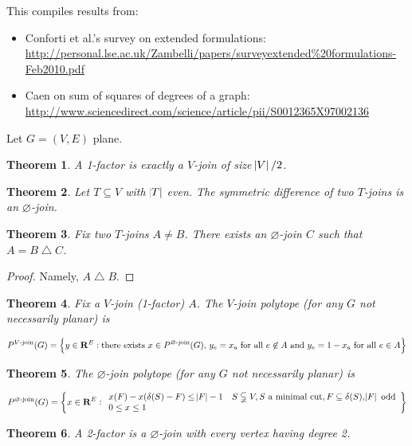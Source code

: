 \documentclass{article}
\newtheorem{theorem}{Theorem}
\begin{document}
This compiles results from:
\begin{itemize}
\item Conforti et al.'s survey on extended formulations: \url{http://personal.lse.ac.uk/Zambelli/papers/surveyextended\%20formulations-Feb2010.pdf}
\item Caen on sum of squares of degrees of a graph: \url{http://www.sciencedirect.com/science/article/pii/S0012365X97002136}
\end{itemize}

Let $G=(V,E)$ plane.

\begin{theorem}
	A 1-factor is exactly a $V$-join of size $\abs{V}/2$.
\end{theorem}
\begin{theorem}
Let $T\subseteq V$ with $\abs{T}$ even. The symmetric difference of two $T$-joins is an $\varnothing$-join.
\end{theorem}
\begin{theorem}
Fix two $T$-joins $A\neq B$. There exists an $\varnothing$-join $C$ such that $A = B\bigtriangleup C$.
\end{theorem}
\begin{proof}
Namely, $A\bigtriangleup B$.
\end{proof}

\begin{theorem}
Fix a $V$-join (1-factor) $A$. The $V$-join polytope (for any $G$ not necessarily planar) is

$$P^{\text{$V$-join}}(G) = \cbr{y\in \mathbf{R}^E: \text{there exists $x\in P^{\text{$\varnothing$-join}}(G)$, $y_e = x_e$ for all $e\not\in A$ and $y_e=1-x_e$ for all $e\in A$}}$$
\end{theorem}

\begin{theorem}
The $\varnothing$-join polytope (for any $G$ not necessarily planar) is

$$P^{\text{$\varnothing$-join}}(G) = \cbr{x\in\mathbf{R}^E: \begin{array}{ll}
x(F)-x(\delta(S)-F) \leq \abs{F}-1 & S\subsetneqq V, \text{$S$ a minimal cut}, F\subseteq \delta(S), \abs{F}\text{ odd} \\
0\leq x\leq 1 &
\end{array}}$$
\end{theorem}

\begin{theorem}
A 2-factor is a $\varnothing$-join with every vertex having degree 2.
\end{theorem}
\end{document}
